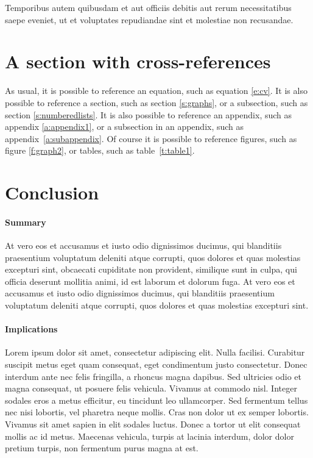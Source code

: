 \documentclass[letterpaper,11pt,leqno]{article}
\begin{document}
Temporibus autem quibusdam et aut officiis debitis aut rerum necessitatibus saepe eveniet, ut et voluptates repudiandae sint et molestiae non recusandae.

\section{A section with cross-references}

As usual, it is possible to reference an equation, such as equation \eqref{e:cv}. It is also possible to reference a section, such as section \ref{s:graphs}, or a subsection, such as section \ref{s:numberedlists}. It is also possible to reference an appendix, such as appendix \ref{a:appendix1}, or a subsection in an appendix, such as appendix~\ref{a:subappendix}. Of course it is possible to reference figures, such as figure \ref{f:graph2}, or tables, such as table~\ref{t:table1}.


\section{Conclusion}\label{s:ccl}

\paragraph{Summary}  At vero eos et accusamus et iusto odio dignissimos ducimus, qui blanditiis praesentium voluptatum deleniti atque corrupti, quos dolores et quas molestias excepturi sint, obcaecati cupiditate non provident, similique sunt in culpa, qui officia deserunt mollitia animi, id est laborum et dolorum fuga. At vero eos et accusamus et iusto odio dignissimos ducimus, qui blanditiis praesentium voluptatum deleniti atque corrupti, quos dolores et quas molestias excepturi sint.

\paragraph{Implications} Lorem ipsum dolor sit amet, consectetur adipiscing elit. Nulla facilisi. Curabitur suscipit metus eget quam consequat, eget condimentum justo consectetur. Donec interdum ante nec felis fringilla, a rhoncus magna dapibus. Sed ultricies odio et magna consequat, ut posuere felis vehicula. Vivamus at commodo nisl. Integer sodales eros a metus efficitur, eu tincidunt leo ullamcorper. Sed fermentum tellus nec nisi lobortis, vel pharetra neque mollis. Cras non dolor ut ex semper lobortis. Vivamus sit amet sapien in elit sodales luctus. Donec a tortor ut elit consequat mollis ac id metus. Maecenas vehicula, turpis at lacinia interdum, dolor dolor pretium turpis, non fermentum purus magna at est. 
\end{document}
